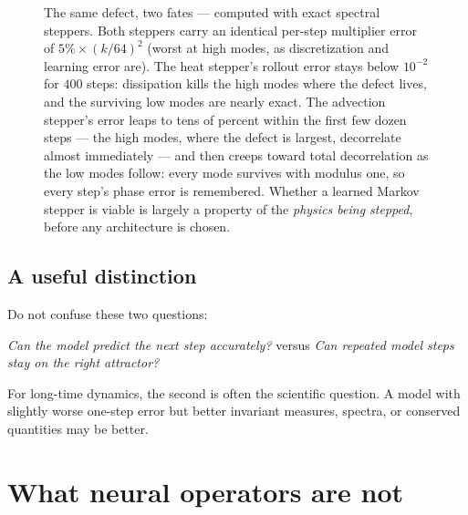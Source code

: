 \documentclass[10pt,a4paper]{article}
\begin{document}
\begin{figure}[t]
\centering
{}
\caption{The same defect, two fates --- computed with exact spectral
steppers. Both steppers carry an identical per-step multiplier error of
$5\% \times (k/64)^2$ (worst at high modes, as discretization and learning
error are). The heat stepper's rollout error stays below $10^{-2}$ for
$400$ steps: dissipation kills the high modes where the defect lives, and
the surviving low modes are nearly exact. The advection stepper's error
leaps to tens of percent within the first few dozen steps --- the high
modes, where the defect is largest, decorrelate almost immediately ---
and then creeps toward total decorrelation as the low modes follow:
every mode survives with modulus one, so every step's phase error is
remembered. Whether a learned
Markov stepper is viable is largely a property of the \emph{physics being
stepped}, before any architecture is chosen.}
\label{fig:rollout}
\end{figure}

\subsection{A useful distinction}

Do not confuse these two questions:
\begin{center}
\emph{Can the model predict the next step accurately?}
\qquad versus \qquad
\emph{Can repeated model steps stay on the right attractor?}
\end{center}
For long-time dynamics, the second is often the scientific question. A model
with slightly worse one-step error but better invariant measures, spectra, or
conserved quantities may be better.

\section{What neural operators are not}
\label{sec:not}
\end{document}
